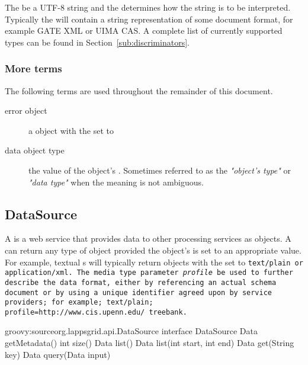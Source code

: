The \payload \should be a UTF-8 string and the \discriminator determines how the string is to be interpreted.  Typically the \payload will contain a string representation of some document format, for example GATE XML or UIMA CAS.  A complete list of currently supported \discriminator types can be found in Section~\ref{sub:discriminators}. 

\subsubsection{More terms}
The following terms are used throughout the remainder of this document.

\begin{description}
\item[error object] a \data object with the \discriminator set to 
\item[data object type] the value of the \data object's \discriminator. Sometimes referred to as the \emph{"object's type"} or \emph{"data type"} when the meaning is not ambiguous.
\end{description}


\subsection{DataSource}


A \source is a web service that provides data to other processing services as \data objects. A \source can return any type of \data object provided the \data object's \discriminator is set to an appropriate value.  For example, textual \source{}s will typically return \data objects with the \discriminator set to \tt{text/plain} or \tt{application/xml}. The media type parameter \emph{profile}  \may be used to further describe the data format, either by referencing an actual schema document or by using a unique identifier agreed upon by service providers; for example; \tt{text/plain; profile=http://www.cis.upenn.edu/~treebank}.

\begin{groovy}{groovy:source}{org.lappsgrid.api.DataSource}
	interface DataSource {
		Data getMetadata()
		int size()
		Data list()
		Data list(int start, int end)
		Data get(String key)
		Data query(Data input)
	}
\end{groovy}

